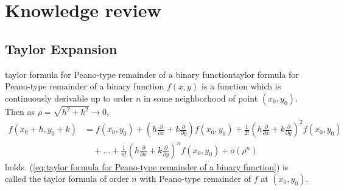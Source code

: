 \chapter{Knowledge review}

\section{Taylor Expansion}
\begin{theorem}{taylor formula for Peano-type remainder of a binary function}{taylor formula for Peano-type remainder of a binary function}
    $f(x,y)$ is a function which is continuously derivable up to order $n$ in some neighborhood of point $(x_0,y_0)$. 
    Then as $\rho = \sqrt{h^2+k^2}\rightarrow 0$, 
    \begin{equation}
        \begin{aligned}
            f(x_0+h,y_0+k)&=f(x_0,y_0)+(h\frac{\partial}{\partial x}+k\frac{\partial}{\partial y})f(x_0,y_0)
            +\frac{1}{2!}(h\frac{\partial}{\partial x}+k\frac{\partial}{\partial y})^2f(x_0,y_0)\\
            &\quad +\dots+
            \frac{1}{n!}(h\frac{\partial}{\partial x}+k\frac{\partial}{\partial y})^n f(x_0,y_0) + o(\rho^n)
        \end{aligned}
        \label{eq:taylor formula for Peano-type remainder of a binary function}
    \end{equation}
    holds. (\ref{eq:taylor formula for Peano-type remainder of a binary function}) 
    is called the taylor formula of order $n$ with Peano-type remainder of $f$ at $(x_0,y_0)$.
\end{theorem}


